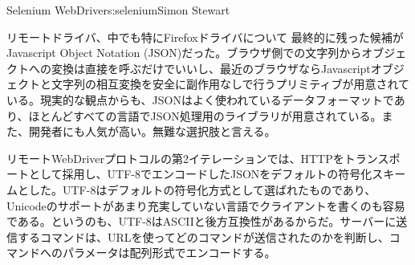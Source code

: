 \begin{aosachapter}{Selenium WebDriver}{s:selenium}{Simon Stewart}
\begin{aosasect1}{リモートドライバ、中でも特にFirefoxドライバについて}
最終的に残った候補がJavascript Object Notation (JSON)だった。ブラウザ側での文字列からオブジェクトへの変換は直接を呼ぶだけでいいし、最近のブラウザならJavascriptオブジェクトと文字列の相互変換を安全に副作用なしで行うプリミティブが用意されている。現実的な観点からも、JSONはよく使われているデータフォーマットであり、ほとんどすべての言語でJSON処理用のライブラリが用意されている。また、開発者にも人気が高い。無難な選択肢と言える。

リモートWebDriverプロトコルの第2イテレーションでは、HTTPをトランスポートとして採用し、UTF-8でエンコードしたJSONをデフォルトの符号化スキームとした。UTF-8はデフォルトの符号化方式として選ばれたものであり、Unicodeのサポートがあまり充実していない言語でクライアントを書くのも容易である。というのも、UTF-8はASCIIと後方互換性があるからだ。サーバーに送信するコマンドは、URLを使ってどのコマンドが送信されたのかを判断し、コマンドへのパラメータは配列形式でエンコードする。


\end{aosasect1}
\end{aosachapter}
